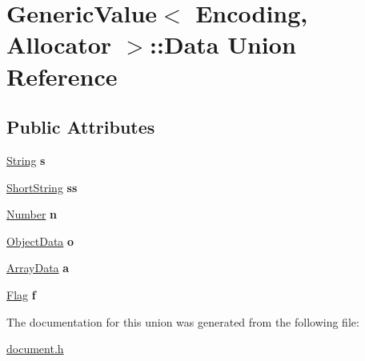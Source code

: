 \hypertarget{a02116}{}\section{Generic\+Value$<$ Encoding, Allocator $>$\+:\+:Data Union Reference}
\label{a02116}
\subsection*{Public Attributes}
\begin{DoxyCompactItemize}
\item 
\mbox{\label{a02116_a6872a4b93763944063b425e6c001ed2b}} 
\hyperlink{a02088}{String} {\bfseries s}
\item 
\mbox{\label{a02116_a410e39a5dc296eb3b152b54193740e4c}} 
\hyperlink{a02092}{Short\+String} {\bfseries ss}
\item 
\mbox{\label{a02116_a243007cce2f4b75bea3e3c1ee4c3c239}} 
\hyperlink{a02096}{Number} {\bfseries n}
\item 
\mbox{\label{a02116_af6417eca530fba0d8bd65d309628eb11}} 
\hyperlink{a02108}{Object\+Data} {\bfseries o}
\item 
\mbox{\label{a02116_aeac31cf55bf5a024cead5ecb63e4fd48}} 
\hyperlink{a02112}{Array\+Data} {\bfseries a}
\item 
\mbox{\label{a02116_ad8572112da083c775ce21bcbca96b2ab}} 
\hyperlink{a02084}{Flag} {\bfseries f}
\end{DoxyCompactItemize}


The documentation for this union was generated from the following file\+:\begin{DoxyCompactItemize}
\item 
\hyperlink{a00476}{document.\+h}\end{DoxyCompactItemize}
